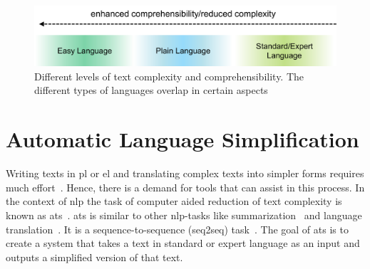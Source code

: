 \begin{figure}
    \centering
    \includegraphics[width=\linewidth]{images/easy_languages}
    \caption[Different levels of text complexity and comprehensibility.]{Different levels of text complexity and comprehensibility. The different types of languages overlap in certain aspects~\autocite{easyLanguageBook, selbsterstellt}}
    \label{fig:languages}
\end{figure}




%
%
%
%


%


%



\section{Automatic Language Simplification}\label{sec:langSimp}

Writing texts in \gls{pl} or \gls{el} and translating complex texts into simpler forms requires much effort~\autocite{easyLanguageBook}.
Hence, there is a demand for tools that can assist in this process.
In the context of \gls{nlp} the task of computer aided reduction of text complexity is known as \gls{ats}~\autocite{Ansch_tz_2023}.
\gls{ats} is similar to other \gls{nlp}-tasks like summarization~\autocite{rios-etal-2021-new} and language translation~\autocite{aumiller2022klexikon}.
It is a sequence-to-sequence (seq2seq) task~\autocite{Ansch_tz_2023}.
The goal of \gls{ats} is to create a system that takes a text in standard or expert language as an input and outputs a simplified version of that text.

